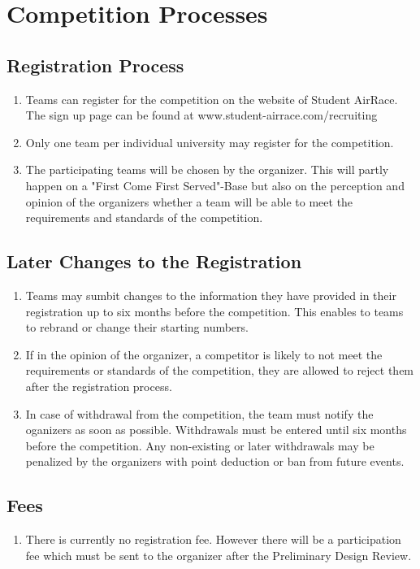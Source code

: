     \section{Competition Processes}

    \subsection{Registration Process}
    \begin{enumerate}
      \item Teams can register for the competition on the website of Student AirRace. The sign up page can be found at www.student-airrace.com/recruiting 
      \item Only one team per individual university may register for the competition.  
      \item The participating teams will be chosen by the organizer. This will partly happen on a "First Come First Served"-Base but also
      on the perception and opinion of the organizers whether a team will be able to meet the requirements and standards of the competition. 
    \end{enumerate}

    \subsection{Later Changes to the Registration}
    \begin{enumerate}
      \item Teams may sumbit changes to the information they have provided in their registration up to six months before the competition. This enables to teams to rebrand or change their starting numbers.
      \item If in the opinion of the organizer, a competitor is likely to not meet the requirements or standards
      of the competition, they are allowed to reject them after the registration process. 
      \item In case of withdrawal from the competition, the team must notify the oganizers as soon as possible. Withdrawals must be entered until six months before the competition. 
      Any non-existing or later withdrawals may be penalized by the organizers with point deduction or ban from future events. 
    \end{enumerate}

    \subsection{Fees}
    \begin{enumerate}
      \item There is currently no registration fee. However there will be a participation fee which must be sent to the organizer after the Preliminary Design Review.

    \end{enumerate}


